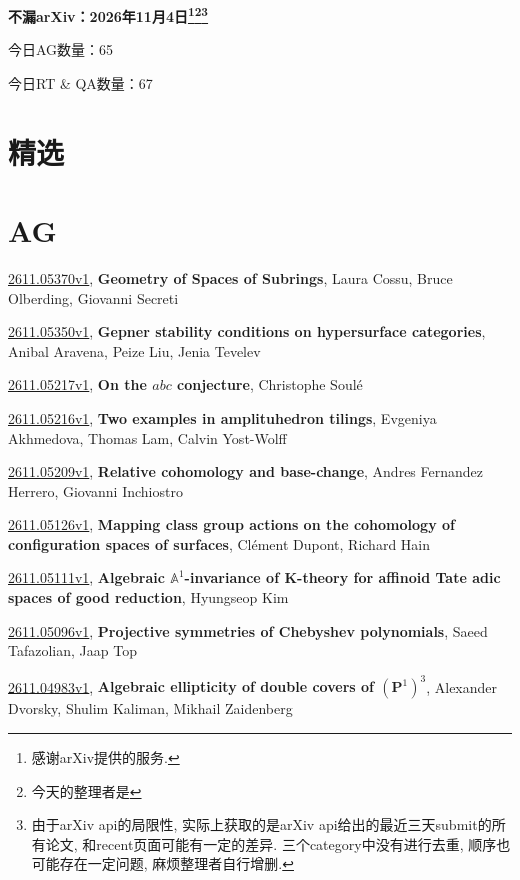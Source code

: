 \documentclass[9pt, a4paper]{article}
\theoremstyle{plain}
\theoremstyle{definition}
\theoremstyle{remark}
\newcommand{\arxiv}[3]{\href{https://arxiv.org/abs/#1}{#1}, \textbf{\textcolor{arxivblue}{#2}}, #3}
\newcommand{\AGnumber}{65}
\newcommand{\RTQAnumber}{67}
\newcommand{\NewestDate}{2026年11月4日}
\newcommand{\todayarXiver}{} %
\begin{document}
\begin{center}
    \Huge\textbf{不漏arXiv：\NewestDate\footnote{感谢arXiv提供的服务.}\footnote{今天的整理者是\todayarXiver}\footnote{由于arXiv api的局限性, 实际上获取的是arXiv api给出的最近三天submit的所有论文, 和recent页面可能有一定的差异. 三个category中没有进行去重, 顺序也可能存在一定问题, 麻烦整理者自行增删.}} \\
\end{center}

\setcounter{section}{-1}

\begin{center}
    今日AG数量：\AGnumber
    
    今日RT \& QA数量：\RTQAnumber
    
\end{center}


\section{精选}


\section{AG}
\arxiv{2611.05370v1}{Geometry of Spaces of Subrings}{Laura Cossu, Bruce Olberding, Giovanni Secreti}

\arxiv{2611.05350v1}{Gepner stability conditions on hypersurface categories}{Anibal Aravena, Peize Liu, Jenia Tevelev}

\arxiv{2611.05217v1}{On the $abc$ conjecture}{Christophe Soulé}

\arxiv{2611.05216v1}{Two examples in amplituhedron tilings}{Evgeniya Akhmedova, Thomas Lam, Calvin Yost-Wolff}

\arxiv{2611.05209v1}{Relative cohomology and base-change}{Andres Fernandez Herrero, Giovanni Inchiostro}

\arxiv{2611.05126v1}{Mapping class group actions on the cohomology of configuration spaces of surfaces}{Clément Dupont, Richard Hain}

\arxiv{2611.05111v1}{Algebraic $\mathbb{A}^{1}$-invariance of K-theory for affinoid Tate adic spaces of good reduction}{Hyungseop Kim}

\arxiv{2611.05096v1}{Projective symmetries of Chebyshev polynomials}{Saeed Tafazolian, Jaap Top}

\arxiv{2611.04983v1}{Algebraic ellipticity of double covers of $(\mathbf P^1)^3$}{Alexander Dvorsky, Shulim Kaliman, Mikhail Zaidenberg}
\end{document}
